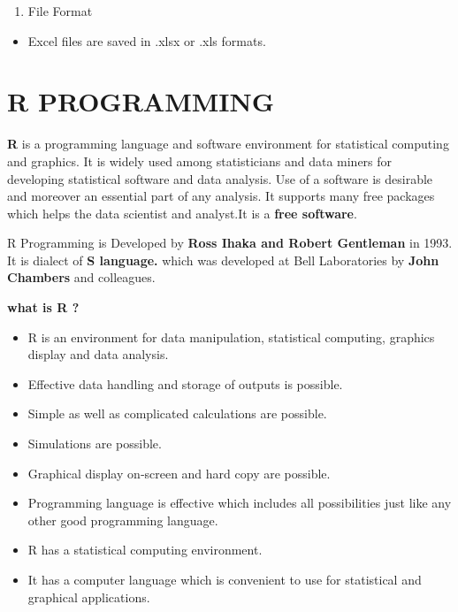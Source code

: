 \documentclass[
]{article}
\providecommand{\tightlist}{%
  \setlength{\itemsep}{0pt}\setlength{\parskip}{0pt}}
\begin{document}
\begin{enumerate}
\def\labelenumi{\arabic{enumi}.}
\setcounter{enumi}{5}
\tightlist
\item
  File Format
\end{enumerate}

\begin{itemize}
\tightlist
\item
  Excel files are saved in .xlsx or .xls formats.
\end{itemize}

\newpage

\section{R PROGRAMMING}\label{r-programming}

\textbf{R} is a programming language and software environment for
statistical computing and graphics. It is widely used among
statisticians and data miners for developing statistical software and
data analysis. Use of a software is desirable and moreover an essential
part of any analysis. It supports many free packages which helps the
data scientist and analyst.It is a \textbf{free software}.

R Programming is Developed by \textbf{Ross Ihaka and Robert Gentleman}
in 1993. It is dialect of \textbf{S language.} which was developed at
Bell Laboratories by \textbf{John Chambers} and colleagues.

\textbf{what is R ?}

\begin{itemize}
\item
  R is an environment for data manipulation, statistical computing,
  graphics display and data analysis.
\item
  Effective data handling and storage of outputs is possible.
\item
  Simple as well as complicated calculations are possible.
\item
  Simulations are possible.
\item
  Graphical display on‐screen and hard copy are possible.
\item
  Programming language is effective which includes all possibilities
  just like any other good programming language.
\item
  R has a statistical computing environment.
\item
  It has a computer language which is convenient to use for statistical
  and graphical applications.
\end{itemize}
\end{document}
